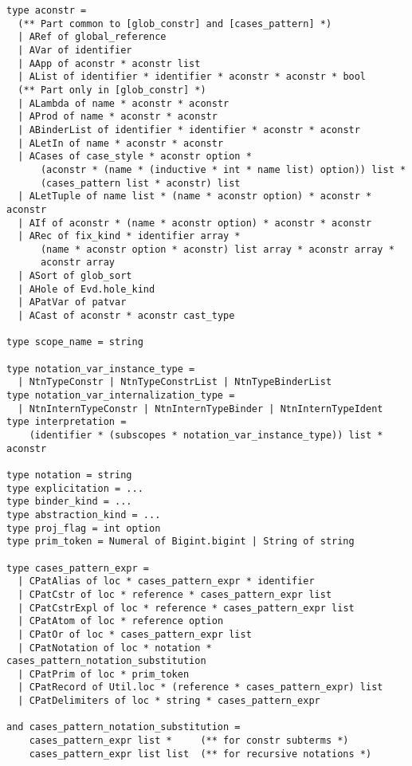 \documentclass[a4paper,oneside]{book}
\begin{document}
\begin{lstlisting}
type aconstr =
  (** Part common to [glob_constr] and [cases_pattern] *)
  | ARef of global_reference
  | AVar of identifier
  | AApp of aconstr * aconstr list
  | AList of identifier * identifier * aconstr * aconstr * bool
  (** Part only in [glob_constr] *)
  | ALambda of name * aconstr * aconstr
  | AProd of name * aconstr * aconstr
  | ABinderList of identifier * identifier * aconstr * aconstr
  | ALetIn of name * aconstr * aconstr
  | ACases of case_style * aconstr option *
      (aconstr * (name * (inductive * int * name list) option)) list *
      (cases_pattern list * aconstr) list
  | ALetTuple of name list * (name * aconstr option) * aconstr * aconstr
  | AIf of aconstr * (name * aconstr option) * aconstr * aconstr
  | ARec of fix_kind * identifier array *
      (name * aconstr option * aconstr) list array * aconstr array *
      aconstr array
  | ASort of glob_sort
  | AHole of Evd.hole_kind
  | APatVar of patvar
  | ACast of aconstr * aconstr cast_type

type scope_name = string

type notation_var_instance_type =
  | NtnTypeConstr | NtnTypeConstrList | NtnTypeBinderList
type notation_var_internalization_type =
  | NtnInternTypeConstr | NtnInternTypeBinder | NtnInternTypeIdent
type interpretation =
    (identifier * (subscopes * notation_var_instance_type)) list * aconstr

type notation = string
type explicitation = ...
type binder_kind = ...
type abstraction_kind = ...
type proj_flag = int option
type prim_token = Numeral of Bigint.bigint | String of string

type cases_pattern_expr =
  | CPatAlias of loc * cases_pattern_expr * identifier
  | CPatCstr of loc * reference * cases_pattern_expr list
  | CPatCstrExpl of loc * reference * cases_pattern_expr list
  | CPatAtom of loc * reference option
  | CPatOr of loc * cases_pattern_expr list
  | CPatNotation of loc * notation * cases_pattern_notation_substitution
  | CPatPrim of loc * prim_token
  | CPatRecord of Util.loc * (reference * cases_pattern_expr) list
  | CPatDelimiters of loc * string * cases_pattern_expr

and cases_pattern_notation_substitution =
    cases_pattern_expr list *     (** for constr subterms *)
    cases_pattern_expr list list  (** for recursive notations *)


\end{lstlisting}
\end{document}
